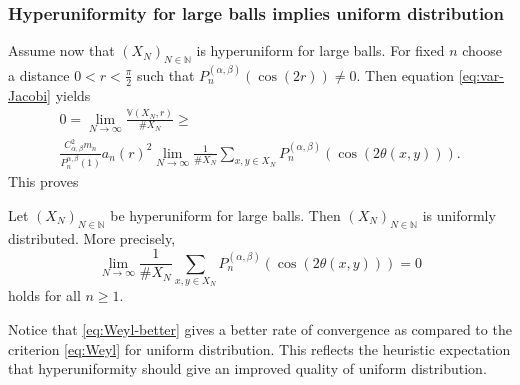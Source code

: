 \subsubsection{Hyperuniformity for large balls implies uniform
  distribution}\label{sec:hyper-large-balls}
Assume now that $(X_N)_{N\in\mathbb{N}}$ is hyperuniform for large balls. For
fixed $n$ choose a distance $0<r<\frac\pi2$ such that
$P_n^{(\alpha,\beta)}(\cos(2r))\neq0$. Then equation \eqref{eq:var-Jacobi}
yields
\begin{multline*}
  0=\lim_{N\to\infty}\frac{\mathbb{V}(X_N,r)}{\#X_N}\geq\\
  \frac{C_{\alpha,\beta}^2m_n}{P_n^{\alpha,\beta}(1)}a_n(r)^2
  \lim_{N\to\infty}\frac1{\#X_N}
  \sum_{x,y\in X_N}P_n^{(\alpha,\beta)}(\cos(2\theta(x,y))).
\end{multline*}
This proves
\begin{theorem}\label{thm:large}
  Let $(X_N)_{N\in\mathbb{N}}$ be hyperuniform for large balls. Then
  $(X_N)_{N\in\mathbb{N}}$ is uniformly distributed. More precisely,
  \begin{equation}\label{eq:Weyl-better}
    \lim_{N\to\infty}\frac1{\#X_N}
  \sum_{x,y\in X_N}P_n^{(\alpha,\beta)}(\cos(2\theta(x,y)))=0
\end{equation}
holds for all $n\geq1$.
\end{theorem}
\begin{remark}
  Notice that \eqref{eq:Weyl-better} gives a better rate of convergence as
  compared to the criterion \eqref{eq:Weyl} for uniform distribution. This
  reflects the heuristic expectation that hyperuniformity should give an
  improved quality of uniform distribution.
\end{remark}

